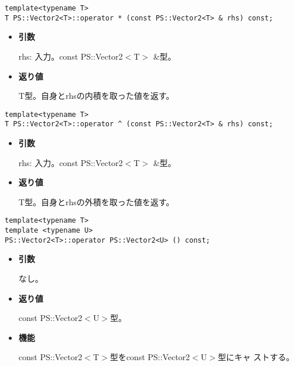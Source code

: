 
\begin{screen}
\begin{verbatim}
template<typename T>
T PS::Vector2<T>::operator * (const PS::Vector2<T> & rhs) const;
\end{verbatim}
\end{screen}

\begin{itemize}

\item{{\bf 引数}}

{rhs}: 入力。{const PS::Vector2$<$T$>$ \&}型。

\item{{\bf 返り値}}

{T}型。自身と{rhs}の内積を取った値を返す。

\end{itemize}

\begin{screen}
\begin{verbatim}
template<typename T>
T PS::Vector2<T>::operator ^ (const PS::Vector2<T> & rhs) const;
\end{verbatim}
\end{screen}

\begin{itemize}

\item{{\bf 引数}}

{rhs}: 入力。{const PS::Vector2$<$T$>$ \&}型。

\item{{\bf 返り値}}

{T}型。自身と{rhs}の外積を取った値を返す。

\end{itemize}


\begin{screen}
\begin{verbatim}
template<typename T>
template <typename U>
PS::Vector2<T>::operator PS::Vector2<U> () const;
\end{verbatim}
\end{screen}

\begin{itemize}

\item{{\bf 引数}}

  なし。

\item{{\bf 返り値}}

  {const PS::Vector2$<$U$>$}型。

\item{{\bf 機能}}

  {const PS::Vector2$<$T$>$}型を{const PS::Vector2$<$U$>$}型にキャ
  ストする。

\end{itemize}


